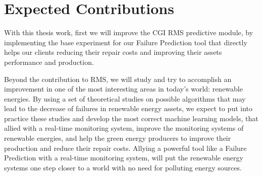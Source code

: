 \section{Expected Contributions} 
\label{sub:if_you_use_this_template} 

With this thesis work, first we will improve the CGI RMS predictive module, by implementing the base experiment for our Failure Prediction tool that directly helps our clients reducing their repair costs and improving their assets performance and production.

Beyond the contribution to RMS, we will study and try to accomplish an improvement in one of the most interesting areas in today’s world: renewable energies. By using a set of theoretical studies on possible algorithms that may lead to the decrease of failures in renewable energy assets, we expect to put into practice these studies and develop the most correct machine learning models, that allied with a real-time monitoring system, improve the monitoring systems of renewable energies, and help the green energy producers to improve their production and reduce their repair costs.
Allying a powerful tool like a Failure Prediction with a real-time monitoring system, will put the renewable energy systems one step closer to a world with no need for polluting energy sources.